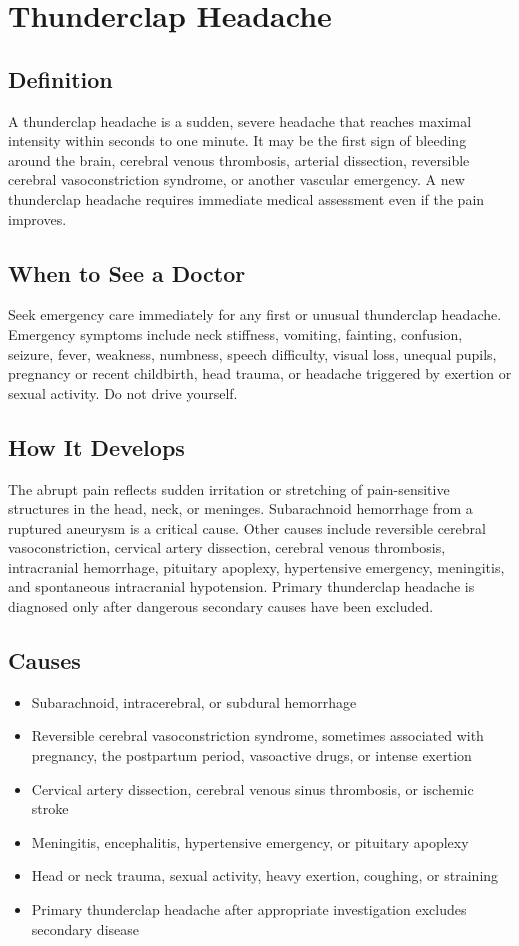 \chapter{Thunderclap Headache}

\section*{Definition}
A thunderclap headache is a sudden, severe headache that reaches maximal intensity within seconds to one minute. It may be the first sign of bleeding around the brain, cerebral venous thrombosis, arterial dissection, reversible cerebral vasoconstriction syndrome, or another vascular emergency. A new thunderclap headache requires immediate medical assessment even if the pain improves.

\section*{When to See a Doctor}
Seek emergency care immediately for any first or unusual thunderclap headache. Emergency symptoms include neck stiffness, vomiting, fainting, confusion, seizure, fever, weakness, numbness, speech difficulty, visual loss, unequal pupils, pregnancy or recent childbirth, head trauma, or headache triggered by exertion or sexual activity. Do not drive yourself.

\section*{How It Develops}
The abrupt pain reflects sudden irritation or stretching of pain-sensitive structures in the head, neck, or meninges. Subarachnoid hemorrhage from a ruptured aneurysm is a critical cause. Other causes include reversible cerebral vasoconstriction, cervical artery dissection, cerebral venous thrombosis, intracranial hemorrhage, pituitary apoplexy, hypertensive emergency, meningitis, and spontaneous intracranial hypotension. Primary thunderclap headache is diagnosed only after dangerous secondary causes have been excluded.

\section*{Causes}
\begin{itemize}
  \item Subarachnoid, intracerebral, or subdural hemorrhage
  \item Reversible cerebral vasoconstriction syndrome, sometimes associated with pregnancy, the postpartum period, vasoactive drugs, or intense exertion
  \item Cervical artery dissection, cerebral venous sinus thrombosis, or ischemic stroke
  \item Meningitis, encephalitis, hypertensive emergency, or pituitary apoplexy
  \item Head or neck trauma, sexual activity, heavy exertion, coughing, or straining
  \item Primary thunderclap headache after appropriate investigation excludes secondary disease
\end{itemize}


